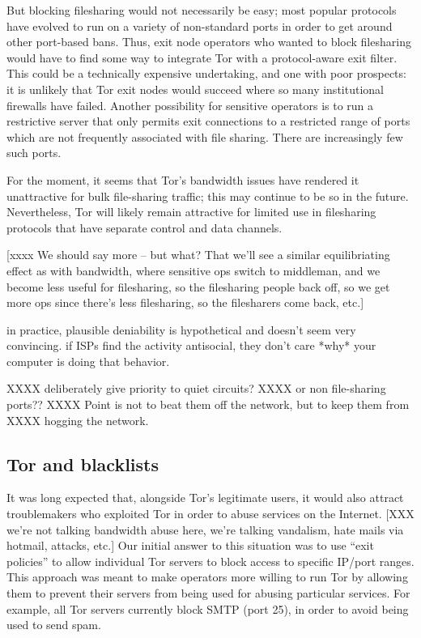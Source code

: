 \documentclass{llncs}
\begin{document}
But blocking filesharing would not necessarily be easy; most popular
protocols have evolved to run on a variety of non-standard ports in order to
get around other port-based bans.  Thus, exit node operators who wanted to
block filesharing would have to find some way to integrate Tor with a
protocol-aware exit filter.  This could be a technically expensive
undertaking, and one with poor prospects: it is unlikely that Tor exit nodes
would succeed where so many institutional firewalls have failed.  Another
possibility for sensitive operators is to run a restrictive server that
only permits exit connections to a restricted range of ports which are
not frequently associated with file sharing.  There are increasingly few such
ports.

For the moment, it seems that Tor's bandwidth issues have rendered it
unattractive for bulk file-sharing traffic; this may continue to be so in the
future.  Nevertheless, Tor will likely remain attractive for limited use in
  filesharing protocols that have separate control and data channels.

[xxxx We should say more -- but what?  That we'll see a similar
  equilibriating effect as with bandwidth, where sensitive ops switch to
  middleman, and we become less useful for filesharing, so the filesharing
  people back off, so we get more ops since there's less filesharing, so the
  filesharers come back, etc.]

in practice, plausible deniability is hypothetical and doesn't seem very
convincing. if ISPs find the activity antisocial, they don't care *why*
your computer is doing that behavior.

XXXX deliberately give priority to quiet circuits?
XXXX or non file-sharing ports??
XXXX Point is not to beat them off the network, but to keep them from
XXXX    hogging the network.

\subsection{Tor and blacklists}

It was long expected that, alongside Tor's legitimate users, it would also
attract troublemakers who exploited Tor in order to abuse services on the
Internet.
[XXX we're not talking bandwidth abuse here, we're talking vandalism,
hate mails via hotmail, attacks, etc.]
Our initial answer to this situation was to use ``exit policies''
to allow individual Tor servers to block access to specific IP/port ranges.
This approach was meant to make operators more willing to run Tor by allowing
them to prevent their servers from being used for abusing particular
services.  For example, all Tor servers currently block SMTP (port 25), in
order to avoid being used to send spam.
\end{document}
